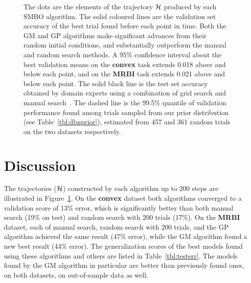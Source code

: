 \documentclass{article}
\newcommand{\vs}[1]{\vspace*{-#1mm}}
\newcommand{\Bs}{\vs{2}}
\newcommand{\as}{\vs{1}}
\begin{document}
\begin{figure}
{    The dots are the elements of the trajectory ${\cal H}$ produced by each SMBO algorithm.
    The solid coloured lines are the validation set accuracy of the best trial found before each point in time.
    Both the GM and GP algorithms make significant advances from their random
    initial conditions, and substantially outperform the manual and random
    search methods. A 95\% confidence interval
    about the best validation means on the {\bf convex} task extends 0.018 above and below each point,
    and on the {\bf MRBI} task extends 0.021 above and below each point.
    The solid black line is the test set accuracy obtained by domain experts using a combination
    of grid search and manual search~\citep{Larochelle+etal:2007}.
    The dashed line is the 99.5\% quantile of validation performance found among trials sampled from our prior distribution (see Table~\ref{tbl:dbnprior}),
    estimated from 457 and 361 random trials on the two datasets respectively.
    }
  \vs{4}
    \label{fig:H}
\end{figure}


\Bs
\section{Discussion}
\label{sec:discussion}
\as

The trajectories (${\cal H}$) constructed by each algorithm up to 200 steps are illustrated in Figure~\ref{fig:H}.
On the {\bf convex} dataset both algorithms converged to a validation score of 13\% error, which is significantly better than both manual search (19\% on test) and random search with 200 trials (17\%).
On the {\bf MRBI} dataset, each of manual search, random search with 200 trials, and the GP algorithm achieved the same result (47\% error), while the GM algorithm found a new best result (44\% error).
The generalization scores of the best models found using these algorithms and others are listed in Table~\ref{tbl:testerr}. The models found by the GM algorithm in particular are better than previously found ones, on both datasets, on out-of-sample data as well.



\end{document}
